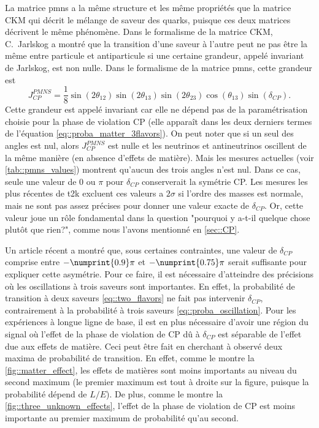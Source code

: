         La matrice \gls{pmns} a la même structure et les même propriétés que la matrice CKM qui décrit le mélange de saveur des quarks, puisque ces deux matrices décrivent le même phénomène. Dans le formalisme de la matrice CKM, C.~Jarlskog a montré que la transition d'une saveur à l'autre peut ne pas être la même entre particule et antiparticule si une certaine grandeur, appelé invariant de Jarlskog, est non nulle\cite{Jarlskog1985}. Dans le formalisme de la matrice \gls{pmns}, cette grandeur est
        \begin{equation}
          J_{CP}^{PMNS}=\frac{1}{8}\sin(2\theta_{12})\sin(2\theta_{13})\sin(2\theta_{23})\cos(\theta_{13})\sin(\delta_{CP}).
        \end{equation}
        Cette grandeur est appelé invariant car elle ne dépend pas de la paramétrisation choisie pour la phase de violation CP (elle apparaît dans les deux derniers termes de l'équation \eqref{eq::proba_matter_3flavors}). On peut noter que si un seul des angles est nul, alors $J_{CP}^{PMNS}$ est nulle et les neutrinos et antineutrinos oscillent de la même manière (en absence d'effets de matière). Mais les mesures actuelles (voir \autoref{tab::pmns_values}) montrent qu'aucun des trois angles n'est nul. Dans ce cas, seule une valeur de $0$ ou $\pi$ pour $\delta_{CP}$ conserverait la symétrie CP. Les mesures les plus récentes de \gls{t2k} excluent ces valeurs a $2\sigma$\cite{Abe2018} si l'ordre des masses est normale, mais ne sont pas assez précises pour donner une valeur exacte de $\delta_{CP}$. Or, cette valeur joue un rôle fondamental dans la question "pourquoi y a-t-il quelque chose plutôt que rien?", comme nous l'avons mentionné en \autoref{sec::CP}.
        
        Un article récent\cite{Buccella2018}  a montré que, sous certaines contraintes, une valeur de $\delta_{CP}$ comprise entre $-\numprint{0.9}\pi$ et $-\numprint{0.75}\pi$ serait suffisante pour expliquer cette asymétrie. Pour ce faire, il est nécessaire d'atteindre des précisions où les oscillations à trois saveurs sont importantes. En effet, la probabilité de transition à deux saveurs \eqref{eq::two_flavors} ne fait pas intervenir $\delta_{CP}$, contrairement à la probabilité à trois saveurs \eqref{eq::proba_oscillation}. Pour les expériences à longue ligne de base, il est en plus nécessaire d'avoir une région du signal où l'effet de la phase de violation de CP dû à $\delta_{CP}$ est séparable de l'effet due aux effets de matière. Ceci peut être fait en cherchant à observé deux maxima de probabilité de transition. En effet,  comme le montre la \autoref{fig::matter_effect}, les effets de matières sont moins importants au niveau du second maximum (le premier maximum est tout à droite sur la figure, puisque la probabilité dépend de $L/E$). De plus, comme le montre la \autoref{fig::three_unknown_effects}, l'effet de la phase de violation de CP est moins importante au premier maximum de probabilité qu'au second.

